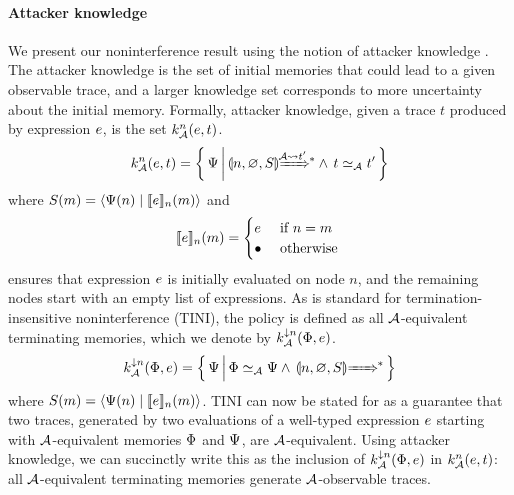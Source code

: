 \paragraph{Attacker knowledge}
We present our noninterference result using the notion of attacker knowledge \cite{Askarov:2008:TNL:1462455.1462485, 4223226}. The attacker knowledge is the set of initial memories that could lead to a given observable trace, and a larger knowledge set corresponds to more uncertainty about the initial memory. Formally, attacker knowledge, given a trace $t$ produced by expression $e$, is the set $\knowledge{n}(\expr, t)$.
\begin{equation*}
\knowledge{n}(\expr, t) = \left\{ \, \altglobalstore \, \middle\vert \, \gconfig{n}{\emptyenv}{S} \gstepstos[][\Attacker \filtertrace t'] \wedge \, t \simeq_{\Attacker} t' \, \right\}
\end{equation*}
where $S(m) = \langle \Psi(n) \mid \llbracket e \rrbracket_n(m) \rangle$ and
\begin{equation*}
\llbracket e \rrbracket_n(m) =
\begin{cases}
e & \text{ if } n = m\\
\bullet & \text{ otherwise }
\end{cases}
\end{equation*}
ensures that expression $e$ is initially evaluated on node $n$, and the remaining nodes start with an empty list of expressions.
As is standard for termination-insensitive noninterference (TINI), the policy \cite{6234468} is defined as all $\mathcal{A}$-equivalent terminating memories, which we denote by $\termknowledge{n}(\globalstore, \expr)$.
\begin{equation*}
\termknowledge{n}(\globalstore, \expr) = \left\{ \,\altglobalstore \, \middle\vert \, \globalstore \simeq_{\Attacker} \altglobalstore \wedge \, \gconfig{n}{\emptyenv}{S} \gstepstos \, \right\}
\end{equation*}
where $S(m) = \langle \Psi(n) \mid \llbracket e \rrbracket_n(m) \rangle$. TINI can now be stated for \lang{} as a guarantee that two traces, generated by two evaluations of a well-typed expression $e$ starting with $\mathcal{A}$-equivalent memories $\Phi$ and $\Psi$, are $\mathcal{A}$-equivalent. Using attacker knowledge, we can succinctly write this as the inclusion of $\termknowledge{n}(\globalstore, \expr)$ in $\knowledge{n}(\expr, t)$: all $\mathcal{A}$-equivalent terminating memories generate $\mathcal{A}$-observable traces.

